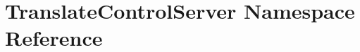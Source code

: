 \section{\-Translate\-Control\-Server \-Namespace \-Reference}
\label{namespaceTranslateControlServer}
